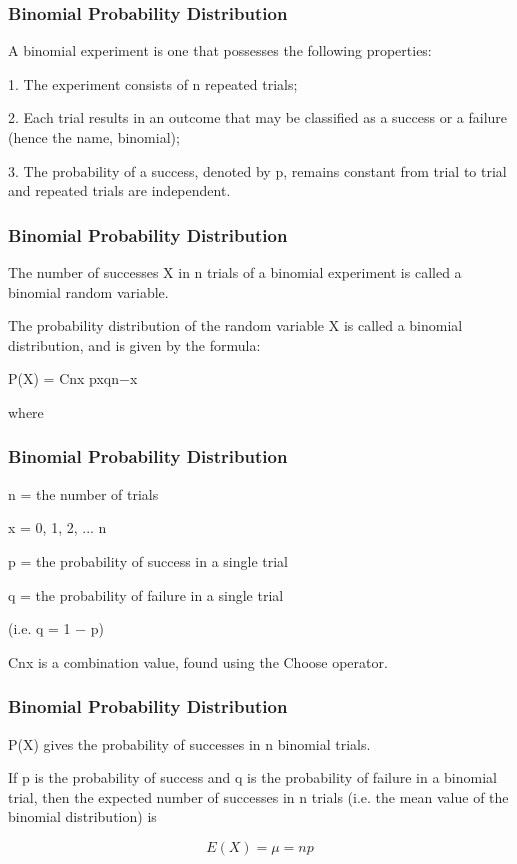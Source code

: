 \documentclass[IntroMain.tex]{subfiles}
\begin{document}
	



\begin{frame}
	\frametitle{Binomial Probability Distribution}
	\Large
	A binomial experiment is one that possesses the following properties:
	
	1.   The experiment consists of n repeated trials;
	
	
	
	2.   Each trial results in an outcome that may be classified as a success or a failure (hence the name, binomial);
	
	
	
	3.   The probability of a success, denoted by p, remains constant from trial to trial and repeated trials are independent.
	
\end{frame}
\begin{frame}
	\frametitle{Binomial Probability Distribution}
	\Large
	
	The number of successes X in n trials of a binomial experiment is called a binomial random variable.
	
	The probability distribution of the random variable X is called a binomial distribution, and is given by the formula:
	
	
	P(X) = Cnx pxqn−x
	
	where
\end{frame}
\begin{frame}
	\frametitle{Binomial Probability Distribution}
	\Large	
	n = the number of trials
	
	x = 0, 1, 2, ... n
	
	p = the probability of success in a single trial
	
	q = the probability of failure in a single trial
	
	(i.e. q = 1 − p)
	
	Cnx is a combination value, found using the Choose operator.
	
\end{frame}
\begin{frame}
	\frametitle{Binomial Probability Distribution}
	\Large
	
	P(X) gives the probability of successes in n binomial trials.
	
	If p is the probability of success and q is the probability of failure in a binomial trial, then the expected number of successes in n trials (i.e. the mean value of the binomial distribution) is
	
	\[E(X) = \mu  = np\]
	
\end{frame}
\end{document}
